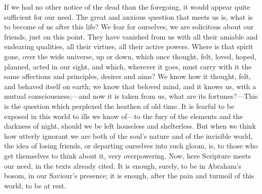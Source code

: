 If we had no other notice of the dead than the foregoing, it would
appear quite sufficient for our need. The great and anxious question
that meets us is, what is to become of us after this life? We fear for
ourselves, we are solicitous about our friends, just on this point.
They have vanished from us with all their amiable and endearing
qualities, all their virtues, all their active powers. Where is that
spirit gone, over the wide universe, up or down, which once thought,
felt, loved, hoped, planned, acted in our sight, and which, wherever
it goes, must carry with it the same affections and principles,
desires and aims? We know how it thought, felt, and behaved itself on
earth; we know that beloved mind, and it knows us, with a mutual
consciousness;—and now it is taken from us, what are its fortunes?—This
is the question which perplexed the heathen of old time. It is fearful
to be exposed in this world to ills we know of—to the fury of the
elements and the darkness of night, should we be left houseless and
shelterless. But when we think how utterly ignorant we are both of the
soul's nature and of the invisible world, the idea of losing friends,
or departing ourselves into such gloom, is, to those who get
themselves to think about it, very overpowering. Now, here Scripture
meets our need, in the texts already cited. It is enough, surely, to
be in Abraham's bosom, in our Saviour's presence; it is enough, after
the pain and turmoil of this world, to be at rest.

